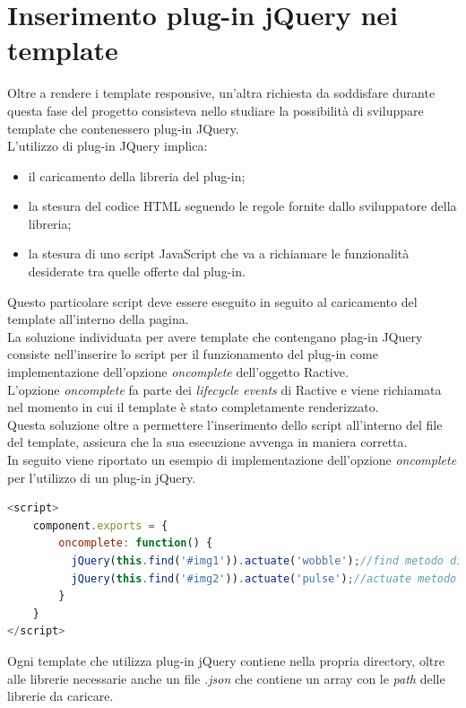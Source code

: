 \section{Inserimento plug-in jQuery nei template}
Oltre a rendere i template responsive, un'altra richiesta da soddisfare durante questa fase del progetto consisteva nello studiare la possibilità di sviluppare template che contenessero plug-in JQuery.\\
L'utilizzo di plug-in JQuery implica:
\begin{itemize}
	\item il caricamento della libreria del plug-in;
	\item la stesura del codice HTML seguendo le regole fornite dallo sviluppatore della libreria;
	\item la stesura di uno script JavaScript che va a richiamare le funzionalità desiderate tra quelle offerte dal plug-in.
\end{itemize}
Questo particolare script deve essere eseguito in seguito al caricamento del template all'interno della pagina.\\
La soluzione individuata per avere template che contengano plag-in JQuery consiste nell'inserire lo script per il funzionamento del plug-in come implementazione dell'opzione \textit{oncomplete} dell'oggetto Ractive.\\
L'opzione \textit{oncomplete} fa parte dei \textit{lifecycle events} di Ractive e viene richiamata nel momento in cui il template è stato completamente renderizzato.\\
Questa soluzione oltre a permettere l'inserimento dello script all'interno del file del template, assicura che la sua esecuzione avvenga in maniera corretta.\\
In seguito viene riportato un esempio di implementazione dell'opzione \textit{oncomplete} per l'utilizzo di un plug-in jQuery.
\begin{lstlisting}[language=JavaScript, caption= Implementazione dell'opzione \textit{oncomplete}]
<script>
	component.exports = {
		oncomplete: function() {
		  jQuery(this.find('#img1')).actuate('wobble');//find metodo di Ractive 
		  jQuery(this.find('#img2')).actuate('pulse');//actuate metodo plug-in
		}
	}
</script>
\end{lstlisting}
Ogni template che utilizza plug-in jQuery contiene nella propria directory, oltre alle librerie necessarie anche un file \textit{.json} che contiene un array con le \textit{path} delle librerie da caricare.


